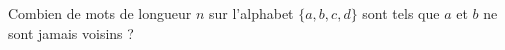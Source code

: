 Combien de mots de longueur $n$ sur l'alphabet $\{a, b, c, d\}$ sont tels que $a$ et $b$ ne sont jamais voisins ?
